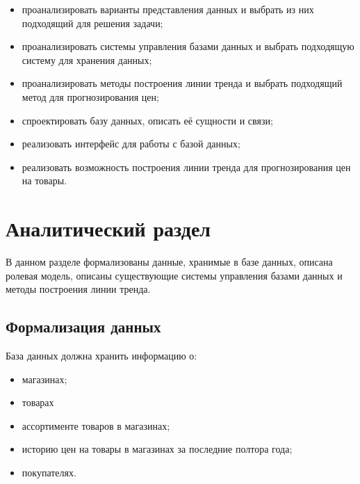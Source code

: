 \documentclass[a4paper,14pt]{extreport}
\begin{document}
\begin{itemize}
	\setlength\itemsep{0.05em}
	\item проанализировать варианты представления данных и выбрать из них подходящий для решения задачи;
	\item проанализировать системы управления базами данных и выбрать подходящую систему для хранения данных;
	\item проанализировать методы построения линии тренда и выбрать подходящий метод для прогнозирования цен;
	\item спроектировать базу данных, описать её сущности и связи;
	\item реализовать интерфейс для работы с базой данных;
	\item реализовать возможность построения линии тренда для прогнозирования цен на товары.
\end{itemize}
	
\chapter{Аналитический раздел}

В данном разделе формализованы данные, хранимые в базе данных, описана ролевая модель, описаны существующие системы управления базами данных и методы построения линии тренда.

\section{Формализация данных}

База данных должна хранить информацию о:

\begin{itemize}
	\setlength\itemsep{0.05em}
	\item магазинах;
	\item товарах
	\item ассортименте товаров в магазинах;
	\item историю цен на товары в магазинах за последние полтора года;
	\item покупателях.
\end{itemize}
\end{document}
